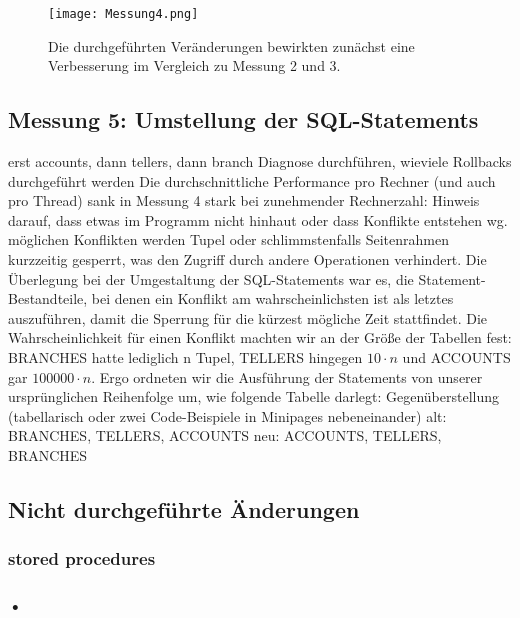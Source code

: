 \documentclass[a4paper, bibliography=totoc, 12pt]{scrartcl}
\begin{document}
	\begin{figure}[h]
	\texttt{[image: Messung4.png]}
	\caption{	Die durchgeführten Veränderungen bewirkten zunächst eine Verbesserung im Vergleich zu Messung 2 und 3.}
	\end{figure}

	\subsection{Messung 5: Umstellung der SQL-Statements}

			erst accounts, dann tellers, dann branch
			Diagnose durchführen, wieviele Rollbacks durchgeführt werden
			Die durchschnittliche Performance pro Rechner (und auch pro Thread) sank in Messung 4 stark bei zunehmender Rechnerzahl:
			Hinweis darauf, dass etwas im Programm nicht hinhaut oder dass Konflikte entstehen
			wg. möglichen Konflikten werden Tupel oder schlimmstenfalls Seitenrahmen kurzzeitig gesperrt, was den Zugriff durch andere Operationen verhindert.
			Die Überlegung bei der Umgestaltung der SQL-Statements war es, die Statement-Bestandteile, bei denen ein Konflikt am wahrscheinlichsten ist als letztes auszuführen, damit die Sperrung für die kürzest mögliche Zeit stattfindet. Die Wahrscheinlichkeit für einen Konflikt machten wir an der Größe der Tabellen fest: BRANCHES hatte lediglich n Tupel, TELLERS hingegen $10 \cdot n$ und ACCOUNTS gar $100000 \cdot n$. Ergo ordneten wir die Ausführung der Statements von unserer ursprünglichen Reihenfolge um, wie folgende Tabelle darlegt:
			Gegenüberstellung (tabellarisch oder zwei Code-Beispiele in Minipages nebeneinander)
			alt: BRANCHES, TELLERS, ACCOUNTS
			neu: ACCOUNTS, TELLERS, BRANCHES
	
	\subsection{Nicht durchgeführte Änderungen}

\subsubsection*{stored procedures}

\subsubsection*{•}
		
\end{document}
